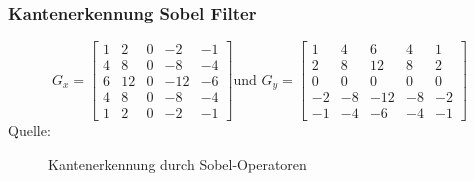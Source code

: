 \documentclass{beamer}
\begin{document}
\begin{frame}
	\frametitle{Kantenerkennung Sobel Filter}
	\[ G_{x}=
	\begin{bmatrix}
	1 & 2 & 0 & -2 & -1 \\
	4 & 8 & 0 & -8 & -4 \\
	6 & 12 & 0 & -12 & -6 \\
	4 & 8 & 0 & -8 & -4 \\
	1 & 2 & 0 & -2 & -1 
	\end{bmatrix}
	\text{und } G_{y}=
	\begin{bmatrix}
	1 & 4 & 6 & 4 & 1 \\
	2 & 8 & 12 & 8 & 2 \\
	0 & 0 & 0 & 0 & 0 \\
	-2 & -8 & -12 & -8 & -2 \\
	-1 & -4 & -6 & -4 & -1 
	\end{bmatrix}
	\]
	\centering\hspace*{0pt}\hbox{\scriptsize Quelle:}
	\begin{figure}
		\centering
		\caption{Kantenerkennung durch Sobel-Operatoren}
		\label{fig:sobel}
	\end{figure}
\end{frame}
\end{document}
